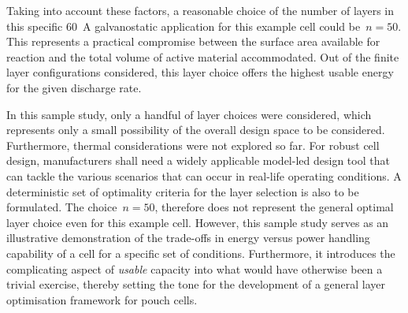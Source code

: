 Taking into account  these factors, a reasonable choice of  the number of layers
in  this specific  \SI{60}{\ampere} galvanostatic  application for  this example
cell  could  be~${n=50}$.  This  represents  a  practical compromise  between  the
surface area  available for  reaction and  the total  volume of  active material
accommodated.  Out of  the finite  layer configurations  considered, this  layer
choice offers the highest usable energy for the given discharge rate.

In this  sample study, only  a handful of  layer choices were  considered, which
represents  only  a  small  possibility  of  the  overall  design  space  to  be
considered. Furthermore,  thermal considerations were  not explored so  far. For
robust  cell design,  manufacturers  shall need  a  widely applicable  model-led
design tool  that can tackle the  various scenarios that can  occur in real-life
operating conditions. A  deterministic set of optimality criteria  for the layer
selection  is also  to  be formulated.  The choice~${n=50}$,  therefore does  not
represent the general optimal layer choice  even for this example cell. However,
this sample study  serves as an illustrative demonstration of  the trade-offs in
energy  versus  power handling  capability  of  a cell  for  a  specific set  of
conditions. Furthermore, it introduces  the complicating aspect of \emph{usable}
capacity into what would have otherwise been a trivial exercise, thereby setting
the tone for the development of a general layer optimisation framework for pouch
cells.

